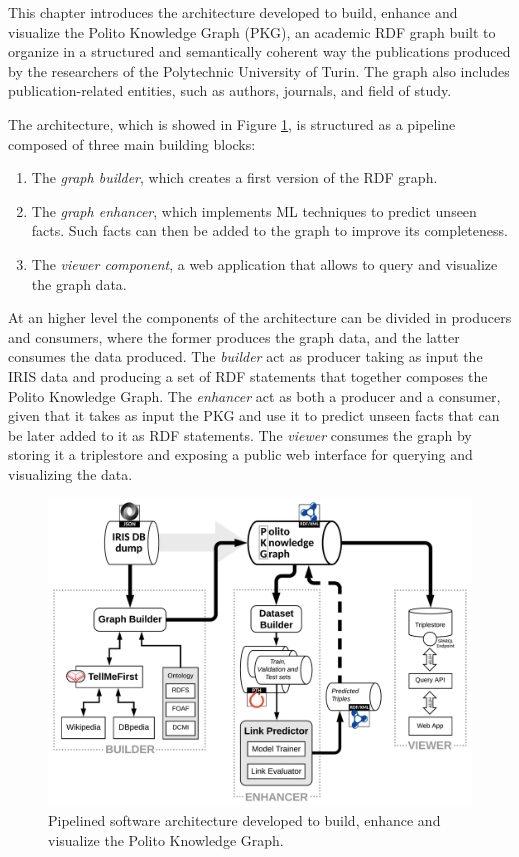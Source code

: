 \documentclass[%
    corpo=13.5pt,
    twoside,
    oldstyle,
    tipotesi=magistrale,
    greek,
    evenboxes
]{toptesi}
\begin{document}
This chapter introduces the architecture developed to build, enhance
and visualize the Polito Knowledge Graph (PKG), an academic RDF graph
built to organize in a structured and semantically coherent way the publications
produced by the researchers of the Polytechnic University of Turin. The graph
also includes publication-related entities, such as authors, journals,
and field of study.

The architecture, which is showed in Figure \ref{fig:pipeline}, is structured
as a pipeline composed of three main building blocks:

\begin{enumerate}
    \item The \emph{graph builder}, which creates a first version of the
    RDF graph.
    \item The \emph{graph enhancer}, which implements ML techniques to predict
    unseen facts. Such facts can then be added to the graph to improve its
    completeness.
    \item The \emph{viewer component}, a web application that allows to query
    and visualize the graph data.
\end{enumerate}

At an higher level the components of the architecture can be divided in
producers and consumers, where the former produces the graph data, and the
latter consumes the data produced.
The \emph{builder} act as producer taking as input the IRIS data
and producing a set of RDF statements that together composes the
Polito Knowledge Graph.
The \emph{enhancer} act as both a producer and a consumer, given that it
takes as input the PKG and use it to predict unseen facts that can be
later added to it as RDF statements.
The \emph{viewer} consumes the graph by storing it a triplestore and exposing
a public web interface for querying and visualizing the data.


\begin{figure}[h]
    \centering
    \includegraphics[scale=0.8]{img/pipeline.png}
    \caption{Pipelined software architecture developed to build,
    enhance and visualize the Polito Knowledge Graph.}
    \label{fig:pipeline}
\end{figure}
\end{document}
